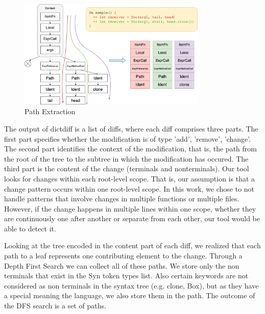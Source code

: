 \begin{figure}[h]
\centering
\includegraphics[width=0.8\textwidth]{linearization.png}
\caption{\label{fig:extraction}Path Extraction}
\end{figure}

The output of dictdiff is a list of diffs, where each diff comprises three parts. The first part specifies whether the modification is of type 'add', 'remove', 'change'. The second part identifies the context of the modification, that is, the path from the root of the tree to the subtree in which the modification has occured. The third part is the content of the change (terminals and nonterminals). Our tool looks for changes within each root-level scope. That is, our assumption is that a change pattern occurs within one root-level scope. In this work, we chose to not handle patterns that involve changes in multiple functions or multiple files. However, if the change happens in multiple lines within one scope, whether they are continuously one after another or separate from each other, our tool would be able to detect it.

Looking at the tree encoded in the content part of each diff, we realized that each path to a leaf represents one contributing element to the change. Through a Depth First Search we can collect all of these paths. We store only the non terminals that exist in the Syn token types list. Also certain keywords are not considered as non terminals in the syntax tree (e.g. clone, Box), but as they have a special meaning the language, we also store them in the path. The outcome of the DFS search is a set of paths.

